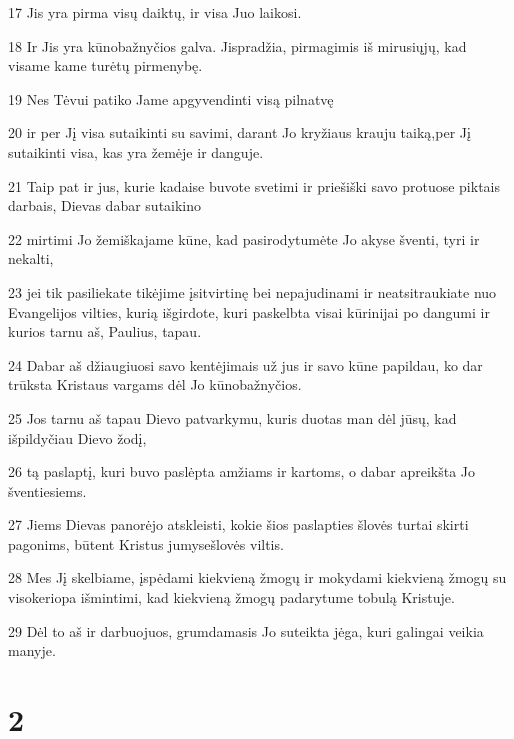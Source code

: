 \par 17 Jis yra pirma visų daiktų, ir visa Juo laikosi. 
\par 18 Ir Jis yra kūno­bažnyčios galva. Jis­pradžia, pirmagimis iš mirusiųjų, kad visame kame turėtų pirmenybę. 
\par 19 Nes Tėvui patiko Jame apgyvendinti visą pilnatvę 
\par 20 ir per Jį visa sutaikinti su savimi, darant Jo kryžiaus krauju taiką,­per Jį sutaikinti visa, kas yra žemėje ir danguje. 
\par 21 Taip pat ir jus, kurie kadaise buvote svetimi ir priešiški savo protuose piktais darbais, Dievas dabar sutaikino 
\par 22 mirtimi Jo žemiškajame kūne, kad pasirodytumėte Jo akyse šventi, tyri ir nekalti, 
\par 23 jei tik pasiliekate tikėjime įsitvirtinę bei nepajudinami ir neatsitraukiate nuo Evangelijos vilties, kurią išgirdote, kuri paskelbta visai kūrinijai po dangumi ir kurios tarnu aš, Paulius, tapau. 
\par 24 Dabar aš džiaugiuosi savo kentėjimais už jus ir savo kūne papildau, ko dar trūksta Kristaus vargams dėl Jo kūno­bažnyčios. 
\par 25 Jos tarnu aš tapau Dievo patvarkymu, kuris duotas man dėl jūsų, kad išpildyčiau Dievo žodį, 
\par 26 tą paslaptį, kuri buvo paslėpta amžiams ir kartoms, o dabar apreikšta Jo šventiesiems. 
\par 27 Jiems Dievas panorėjo atskleisti, kokie šios paslapties šlovės turtai skirti pagonims, būtent Kristus jumyse­šlovės viltis. 
\par 28 Mes Jį skelbiame, įspėdami kiekvieną žmogų ir mokydami kiekvieną žmogų su visokeriopa išmintimi, kad kiekvieną žmogų padarytume tobulą Kristuje. 
\par 29 Dėl to aš ir darbuojuos, grumdamasis Jo suteikta jėga, kuri galingai veikia manyje.


\chapter{2}


